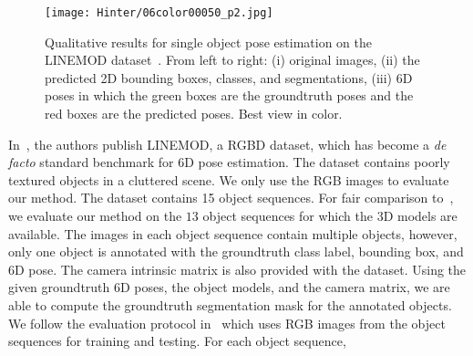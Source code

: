 \documentclass[conference]{IEEEtran}
\newcommand\red[1]{{\color{black}#1}}
\begin{document}
\begin{figure*}[!t]
{       \texttt{[image: Hinter/06color00050\_p2.jpg]} 
}
\\
\vspace{0.1cm}
\caption[]{Qualitative results for single object pose estimation on the LINEMOD dataset~\cite{ACCV12}. From left to right: (i) original images, (ii) the predicted 2D bounding boxes, classes, and segmentations, (iii) 6D poses in which the green boxes are the groundtruth poses and the red boxes are the predicted poses. Best view in color.}
\label{fig:singleobj}
\vspace{-0.3cm}
\end{figure*}
In~\cite{ACCV12}, the authors publish LINEMOD, a RGBD dataset,  which has become a \textit{de facto} standard benchmark for 6D pose estimation. The dataset contains poorly textured objects in a cluttered scene. We only use the RGB images to evaluate our method. The dataset contains 15 object sequences. For fair comparison to~\cite{CVPR16,BB8,SSD-6D}, we evaluate our method on the $13$ object sequences for which the 3D models are available. 
The images in each object sequence contain multiple objects, however, only one object is annotated with the groundtruth class label, bounding box, and 6D pose. The camera intrinsic matrix is also provided with the dataset. Using the given groundtruth 6D poses, the object models, and the camera matrix, we are able to compute the groundtruth segmentation mask for the annotated objects. 
We follow the evaluation protocol in~\cite{CVPR16,BB8} which uses RGB images from the object sequences for training and testing. %
For each object sequence, %
\end{document}
